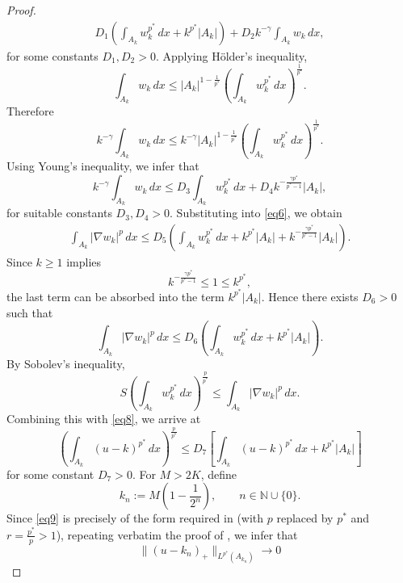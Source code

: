 \documentclass[12pt]{extarticle}
\theoremstyle{definition}
\theoremstyle{remark}
\theoremstyle{definition}
\numberwithin{equation}{section}
\numberwithin{equation}{section}
\begin{document}
\begin{proof}
\begin{align}
				D_1
				\left(
				\int_{A_k}w_k^{p^*}\,dx
				+
				k^{p^*}|A_k|
				\right)
				+
				D_2 k^{-\gamma}
				\int_{A_k}w_k\,dx ,
				\label{eq6}
			\end{align}
			for some constants $D_1,D_2>0$.			
			Applying Hölder's inequality,			
			\[
			\int_{A_k}w_k\,dx
			\le
			|A_k|^{1-\frac1{p^*}}
			\left(
			\int_{A_k}w_k^{p^*}\,dx
			\right)^{\frac1{p^*}}.
			\]			
			Therefore			
			\[
			k^{-\gamma}\int_{A_k}w_k\,dx
			\le
			k^{-\gamma}
			|A_k|^{1-\frac1{p^*}}
			\left(
			\int_{A_k}w_k^{p^*}\,dx
			\right)^{\frac1{p^*}}.
			\]			
			Using Young's inequality, we infer that			
			\[
			k^{-\gamma}\int_{A_k}w_k\,dx
			\le
			D_3
			\int_{A_k}w_k^{p^*}\,dx
			+
			D_4
			k^{-\frac{\gamma p^*}{p^*-1}}
			|A_k|,
			\]			
			for suitable constants $D_3,D_4>0$.			
			Substituting into \eqref{eq6}, we obtain			
			\begin{align}
				\int_{A_k} |\nabla w_k|^p\,dx
				\le
				D_5
				\left(
				\int_{A_k}w_k^{p^*}\,dx
				+
				k^{p^*}|A_k|
				+
				k^{-\frac{\gamma p^*}{p^*-1}}
				|A_k|
				\right).
				\label{eq7}
			\end{align}			
			Since $k\ge1$ implies			
			\[
			k^{-\frac{\gamma p^*}{p^*-1}}
			\le
			1
			\le
			k^{p^*},
			\]			
			the last term can be absorbed into the term
			$k^{p^*}|A_k|$. Hence there exists $D_6>0$ such that			
			\begin{equation}
				\int_{A_k} |\nabla w_k|^p\,dx
				\le
				D_6
				\left(
				\int_{A_k}w_k^{p^*}\,dx
				+
				k^{p^*}|A_k|
				\right).
				\label{eq8}
			\end{equation}			
			By Sobolev's inequality,			
			\[
			S
			\left(
			\int_{A_k}w_k^{p^*}\,dx
			\right)^{\frac{p}{p^*}}
			\le
			\int_{A_k}|\nabla w_k|^p\,dx .
			\]			
			Combining this with \eqref{eq8}, we arrive at			
			\begin{equation}\label{eq9}
				\left(
				\int_{A_k}(u-k)^{p^*}\,dx
				\right)^{\frac{p}{p^*}}
				\le
				D_7
				\left[
				\int_{A_k}(u-k)^{p^*}\,dx
				+
				k^{p^*}|A_k|
				\right]
			\end{equation}
			for some constant $D_7>0$. For $M>2K$, define		
		\[
		k_n:=M\left(1-\frac1{2^n}\right),
		\qquad n\in\mathbb N\cup\{0\}.
		\]		
		Since \eqref{eq9} is precisely of the form required in \cite[Lemma~3.2]{CGL}
		(with $p$ replaced by $p^*$ and $r=\frac{p^*}{p}>1$),
		repeating verbatim the proof of \cite[Lemma~3.2]{CGL}, we infer that		
		\begin{equation}\label{eq10}
			\|(u-k_n)_+\|_{L^{p^*}(A_{k_n})}
			\longrightarrow 0

\end{equation}
\end{proof}
\end{document}

